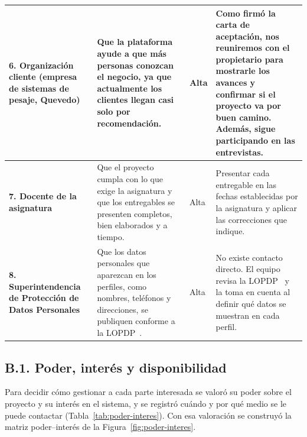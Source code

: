 \documentclass[11pt,a4paper]{article}
\begin{document}
\begin{table}[H]
\begin{tabularx}{\textwidth}{|L{3.1cm}|Y|C{2.0cm}|Y|}
\hline
\textbf{6. Organizaci\'on cliente} (empresa de sistemas de pesaje, Quevedo) & Que la plataforma ayude a que m\'as personas conozcan el negocio, ya que actualmente los clientes llegan casi solo por recomendaci\'on. & Alta & Como firm\'o la carta de aceptaci\'on, nos reuniremos con el propietario para mostrarle los avances y confirmar si el proyecto va por buen camino. Adem\'as, sigue participando en las entrevistas. \\
\hline
\textbf{7. Docente de la asignatura} & Que el proyecto cumpla con lo que exige la asignatura y que los entregables se presenten completos, bien elaborados y a tiempo. & Alta & Presentar cada entregable en las fechas establecidas por la asignatura y aplicar las correcciones que indique. \\
\hline
\textbf{8. Superintendencia de Protecci\'on de Datos Personales} & Que los datos personales que aparezcan en los perfiles, como nombres, tel\'efonos y direcciones, se publiquen conforme a la LOPDP~\cite{lopdp2021}. & Alta & No existe contacto directo. El equipo revisa la LOPDP~\cite{lopdp2021} y la toma en cuenta al definir qu\'e datos se muestran en cada perfil. \\
\hline
\end{tabularx}
\end{table}

\subsection*{B.1. Poder, inter\'es y disponibilidad}

Para decidir c\'omo gestionar a cada parte interesada se valor\'o su poder sobre el proyecto y su inter\'es en el sistema, y se registr\'o cu\'ando y por qu\'e medio se le puede contactar (Tabla~\ref{tab:poder-interes}). Con esa valoraci\'on se construy\'o la matriz poder--inter\'es de la Figura~\ref{fig:poder-interes}.
\end{document}
